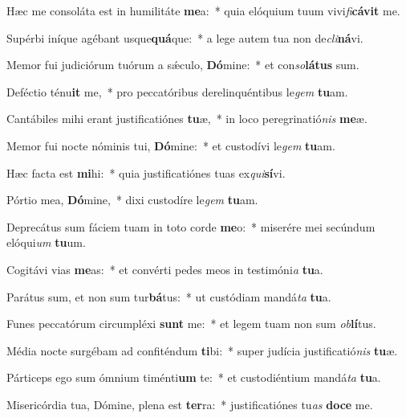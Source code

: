 \item Hæc me consoláta est in humilitáte \textbf{me}a:~* quia elóquium tuum vivi\textit{fi}\textbf{cá}\textbf{vit} me.
\item Supérbi iníque agébant usque\textbf{quá}que:~* a lege autem tua non de\textit{cli}\textbf{ná}vi.
\item Memor fui judiciórum tuórum a sǽculo, \textbf{Dó}mine:~* et con\textit{so}\textbf{lá}\textbf{tus} sum.
\item Deféctio ténu\textbf{it} me,~* pro peccatóribus derelinquéntibus le\textit{gem} \textbf{tu}am.
\item Cantábiles mihi erant justificatiónes \textbf{tu}æ,~* in loco peregrinatió\textit{nis} \textbf{me}æ.
\item Memor fui nocte nóminis tui, \textbf{Dó}mine:~* et custodívi le\textit{gem} \textbf{tu}am.
\item Hæc facta est \textbf{mi}hi:~* quia justificatiónes tuas ex\textit{qui}\textbf{sí}vi.
\item Pórtio mea, \textbf{Dó}mine,~* dixi custodíre le\textit{gem} \textbf{tu}am.
\item Deprecátus sum fáciem tuam in toto corde \textbf{me}o:~* miserére mei secúndum elóqui\textit{um} \textbf{tu}um.
\item Cogitávi vias \textbf{me}as:~* et convérti pedes meos in testimóni\textit{a} \textbf{tu}a.
\item Parátus sum, et non sum tur\textbf{bá}tus:~* ut custódiam mandá\textit{ta} \textbf{tu}a.
\item Funes peccatórum circumpléxi \textbf{sunt} me:~* et legem tuam non sum \textit{ob}\textbf{lí}tus.
\item Média nocte surgébam ad confiténdum \textbf{ti}bi:~* super judícia justificatió\textit{nis} \textbf{tu}æ.
\item Párticeps ego sum ómnium timénti\textbf{um} te:~* et custodiéntium mandá\textit{ta} \textbf{tu}a.
\item Misericórdia tua, Dómine, plena est \textbf{ter}ra:~* justificatiónes tu\textit{as} \textbf{do}\textbf{ce} me.
